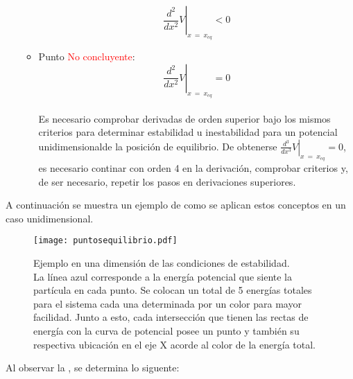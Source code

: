 \documentclass[/home/hernan/Documentos/Apuntes_mecanica_teorica/main.tex]{subfiles}
\begin{document}
\begin{definition}
\begin{itemize}
\begin{itemize}
				\begin{equation}
					\left .  \frac{d^2}{dx^2}V \right|_{x \: = \: x_{eq}} < 0
					\label{eq: puntoinestable}
				\end{equation}
				\item Punto \textcolor{red}{No concluyente}:  				
				\begin{equation}
					\left .  \frac{d^2}{dx^2}V \right|_{x \: = \: x_{eq}} = 0
					\label{eq: puntonoconcluyente}
				\end{equation}
				\\Es necesario comprobar derivadas de orden superior bajo los mismos criterios para determinar estabilidad u inestabilidad para un potencial unidimensionalde la posición de equilibrio. De obtenerse  $\left .  \frac{d^3}{dx^3}V \right|_{x \: = \: x_{eq}}  = 0$, es necesario continar con orden 4 en la derivación, comprobar criterios y, de ser necesario, repetir los pasos en derivaciones superiores.
			\end{itemize}
		\end{itemize}
	\end{definition}

	A continuación se muestra un ejemplo de como se aplican estos conceptos en un caso unidimensional.
	\begin{figure}[H]
		\centering
		\texttt{[image: puntosequilibrio.pdf]}
		\caption{Ejemplo en una dimensión de las condiciones de estabilidad. \\ La línea azul corresponde a la energía potencial que siente la partícula en cada punto. Se colocan un total de 5 energías totales para el sistema cada una determinada por un color para mayor facilidad. Junto a esto, cada intersección que tienen las rectas de energía con la curva de potencial posee un punto y también su respectiva ubicación en el eje X acorde al color de la energía total.}
		\label{fig: puntosequilibrio}
	\end{figure}

	Al observar la , se determina lo siguente:
\end{document}
